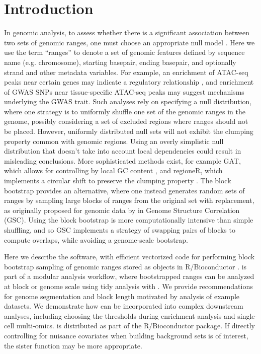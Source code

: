 \section{Introduction}

In genomic analysis, to assess whether
there is a significant association between two sets of genomic ranges, 
one must choose an appropriate null model \citep{reviewdilemma2014,kanduri2018}.
Here we use the term ``ranges'' to denote a set of genomic features defined by sequence name (e.g. chromosome), starting basepair, ending basepair, and optionally strand and other metadata variables.
For example, an enrichment of ATAC-seq peaks near certain genes
may indicate a regulatory relationship \citep{lee2020fluent}, 
and enrichment of GWAS SNPs near tissue-specific ATAC-seq peaks may
suggest mechanisms underlying the GWAS trait.
Such analyses rely on specifying a null distribution, where one
strategy is to uniformly shuffle one set of the
genomic ranges in the genome, possibly considering a set of
excluded regions where ranges should not be placed.
However, uniformly distributed null sets will not exhibit the
clumping property common with genomic regions.
Using an overly simplistic null distribution that doesn't take into
account local dependencies could result in misleading conclusions.
More sophisticated methods exist, for example
GAT, which allows for controlling by local GC content
\citep{GAT_2013}, and regioneR, which implements a circular shift to
preserve the clumping property \citep{gel2016regioner}.
The block bootstrap \citep{politis1999subsampling}
provides an alternative, where one instead generates
random sets of ranges by sampling large blocks of ranges from the
original set with replacement, as originally proposed for 
genomic data by \citet{bickel2010subsampling} in Genome Structure
Correlation (GSC).
Using the block bootstrap is more
computationally intensive than simple shuffling, and so GSC implements
a strategy of swapping pairs of blocks to compute overlaps, while
avoiding a genome-scale bootstrap.

Here we describe the \bootranges software, with efficient
vectorized code for performing block bootstrap sampling of genomic ranges
stored as \granges objects in R/Bioconductor
\citep{lawrence2013software}. 
\bootranges is part of a modular analysis workflow, where bootstrapped
ranges can be analyzed at block or genome scale using tidy
analysis with \plyranges \citep{lee2019plyranges}.
We provide recommendations for genome segmentation and block length
motivated by analysis of example datasets.
We demonstrate how \bootranges can be incorporated into complex
downstream analyses, including choosing the thresholds during
enrichment analysis and single-cell multi-omics.
\bootranges is distributed as part of the \nullranges R/Bioconductor package.
If directly controlling for nuisance covariates when building background sets is of interest, the sister function \matchranges may be more appropriate.

